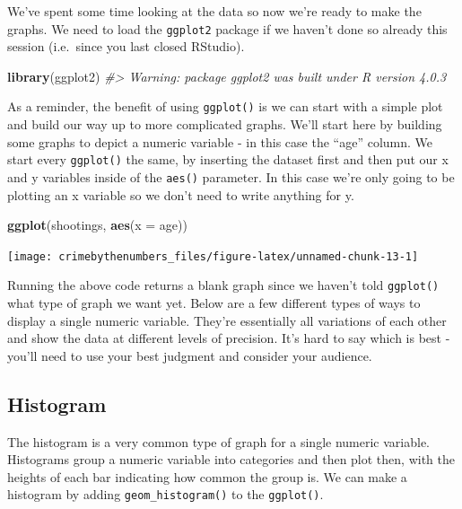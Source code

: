\documentclass[
  12pt,
]{book}
\newenvironment{Shaded}{\begin{snugshade}}{\end{snugshade}}
\newcommand{\CommentTok}[1]{\textcolor[rgb]{0.37,0.37,0.37}{\textit{#1}}}
\newcommand{\DataTypeTok}[1]{\textcolor[rgb]{0.27,0.27,0.27}{#1}}
\newcommand{\KeywordTok}[1]{\textcolor[rgb]{0.27,0.27,0.27}{\textbf{#1}}}
\newcommand{\NormalTok}[1]{#1}
\begin{document}
We've spent some time looking at the data so now we're ready to make the graphs. We need to load the \texttt{ggplot2} package if we haven't done so already this session (i.e.~since you last closed RStudio).

\begin{Shaded}
\begin{Highlighting}[]
\KeywordTok{library}\NormalTok{(ggplot2)}
\CommentTok{\#\textgreater{} Warning: package \textquotesingle{}ggplot2\textquotesingle{} was built under R version 4.0.3}
\end{Highlighting}
\end{Shaded}

As a reminder, the benefit of using \texttt{ggplot()} is we can start with a simple plot and build our way up to more complicated graphs. We'll start here by building some graphs to depict a numeric variable - in this case the ``age'' column. We start every \texttt{ggplot()} the same, by inserting the dataset first and then put our x and y variables inside of the \texttt{aes()} parameter. In this case we're only going to be plotting an x variable so we don't need to write anything for y.

\begin{Shaded}
\begin{Highlighting}[]
\KeywordTok{ggplot}\NormalTok{(shootings, }\KeywordTok{aes}\NormalTok{(}\DataTypeTok{x =}\NormalTok{ age))}
\end{Highlighting}
\end{Shaded}

\begin{center}\texttt{[image: crimebythenumbers\_files/figure-latex/unnamed-chunk-13-1]} \end{center}

Running the above code returns a blank graph since we haven't told \texttt{ggplot()} what type of graph we want yet. Below are a few different types of ways to display a single numeric variable. They're essentially all variations of each other and show the data at different levels of precision. It's hard to say which is best - you'll need to use your best judgment and consider your audience.

\hypertarget{histogram}{%
\subsection{Histogram}\label{histogram}}

The histogram is a very common type of graph for a single numeric variable. Histograms group a numeric variable into categories and then plot then, with the heights of each bar indicating how common the group is. We can make a histogram by adding \texttt{geom\_histogram()} to the \texttt{ggplot()}.
\end{document}
